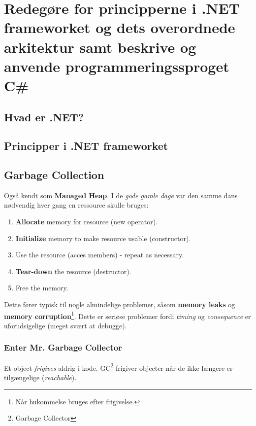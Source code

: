\section{Redegøre for principperne i .NET frameworket og dets overordnede arkitektur samt beskrive og anvende programmeringssproget C\#}\label{sec:spm1}

\subsection{Hvad er .NET?}



\subsection{Principper i .NET frameworket}


\subsection{Garbage Collection}
Også kendt som \textbf{Managed Heap}. I de \textit{gode gamle dage} var den samme dans nødvendig hver gang en ressource skulle bruges:

\begin{enumerate}
	\item \textbf{Allocate} memory for resource (new operator).
	\item \textbf{Initialize} memory to make resource usable (constructor).
	\item Use the resource (acces members) - repeat as necessary.
	\item \textbf{Tear-down} the resource (destructor).
	\item Free the memory.
\end{enumerate}

Dette fører typisk til nogle almindelige problemer, såsom \textbf{memory leaks} og \textbf{memory corruption}\footnote{Når hukommelse bruges efter frigivelse.}. Dette er seriøse problemer fordi \textit{timing} og \textit{consequence} er uforudsigelige (meget svært at debugge).

\subsubsection{Enter Mr. Garbage Collector} 
Et object \textit{frigives} aldrig i kode. GC\footnote{Garbage Collector} frigiver objecter når de ikke længere er tilgængelige (\textit{reachable}).

